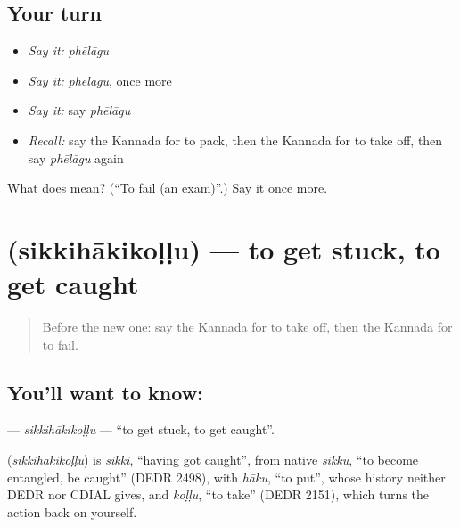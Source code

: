 \subsection*{Your turn}
\begin{itemize}
\raggedright
  \item \emph{Say it:} \emph{phēlāgu}
  \item \emph{Say it:} \emph{phēlāgu}, once more
  \item \emph{Say it:} say \emph{phēlāgu}
  \item \emph{Recall:} say the Kannada for to pack, then the Kannada for to take off, then say \emph{phēlāgu} again
\end{itemize}

\begin{tcolorbox}[breakable,colback=teal!4,colframe=teal!35!black,title={Before you move on}]
What does  mean? (\textquotedblleft{}To fail (an exam)\textquotedblright{}.) Say it once more.
\end{tcolorbox}
\section[\texorpdfstring{\kn{ಸಿಕ್ಕಿಹಾಕಿಕೊಳ್ಳು} (sikkihākikoḷḷu)}{ಸಿಕ್ಕಿಹಾಕಿಕೊಳ್ಳು (sikkihākikoḷḷu)}]{ (sikkihākikoḷḷu) — to get stuck, to get caught}

\label{lesson:KA-C281-sikkihakikollu}



\begin{quote}
Before the new one: say the Kannada for to take off, then the Kannada for to fail.
\end{quote}

\subsection*{You'll want to know: }
\textbf{} — \emph{sikkihākikoḷḷu} — \textquotedblleft{}to get stuck, to get caught\textquotedblright{}.

\begin{cousinweb}
\textbf{} (\emph{sikkihākikoḷḷu}) is \emph{sikki}, \textquotedblleft{}having got caught\textquotedblright{}, from native \emph{sikku}, \textquotedblleft{}to become entangled, be caught\textquotedblright{} (DEDR 2498), with \emph{hāku}, \textquotedblleft{}to put\textquotedblright{}, whose history neither DEDR nor CDIAL gives, and \emph{koḷḷu}, \textquotedblleft{}to take\textquotedblright{} (DEDR 2151), which turns the action back on yourself.
\end{cousinweb}

